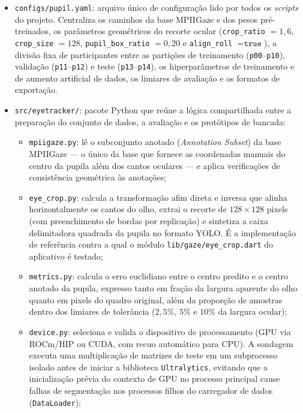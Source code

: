 \begin{itemize}
    \item \texttt{configs/pupil.yaml}: arquivo único de configuração lido por todos os \textit{scripts} do projeto. Centraliza os caminhos da base MPIIGaze e dos pesos pré-treinados, os parâmetros geométricos do recorte ocular (\texttt{crop\_ratio} $= 1{,}6$, \texttt{crop\_size} $= 128$, \texttt{pupil\_box\_ratio} $= 0{,}20$ e \texttt{align\_roll} $= \texttt{true}$), a divisão fixa de participantes entre as partições de treinamento (\texttt{p00}--\texttt{p10}), validação (\texttt{p11}--\texttt{p12}) e teste (\texttt{p13}--\texttt{p14}), os hiperparâmetros de treinamento e de aumento artificial de dados, os limiares de avaliação e os formatos de exportação.
    \item \texttt{src/eyetracker/}: pacote Python que reúne a lógica compartilhada entre a preparação do conjunto de dados, a avaliação e os protótipos de bancada:
    \begin{itemize}
        \item \texttt{mpiigaze.py}: lê o subconjunto anotado (\textit{Annotation Subset}) da base MPIIGaze --- o único da base que fornece as coordenadas manuais do centro da pupila além dos cantos oculares --- e aplica verificações de consistência geométrica às anotações;
        \item \texttt{eye\_crop.py}: calcula a transformação afim direta e inversa que alinha horizontalmente os cantos do olho, extrai o recorte de $128 \times 128$ pixels (com preenchimento de bordas por replicação) e sintetiza a caixa delimitadora quadrada da pupila no formato YOLO. É a implementação de referência contra a qual o módulo \texttt{lib/gaze/eye\_crop.dart} do aplicativo é testado;
        \item \texttt{metrics.py}: calcula o erro euclidiano entre o centro predito e o centro anotado da pupila, expresso tanto em fração da largura aparente do olho quanto em pixels do quadro original, além da proporção de amostras dentro dos limiares de tolerância ($2{,}5\%$, $5\%$ e $10\%$ da largura ocular);
        \item \texttt{device.py}: seleciona e valida o dispositivo de processamento (GPU via ROCm/\allowbreak HIP ou CUDA, com recuo automático para CPU). A sondagem executa uma multiplicação de matrizes de teste em um subprocesso isolado antes de iniciar a biblioteca \texttt{Ultralytics}, evitando que a inicialização prévia do contexto de GPU no processo principal cause falhas de segmentação nos processos filhos do carregador de dados (\texttt{DataLoader});

\end{itemize}
\end{itemize}

